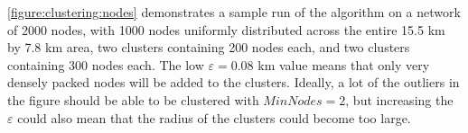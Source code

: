 
\autoref{figure:clustering:nodes} demonstrates a sample run of the algorithm on a network of 2000 nodes, with 1000 nodes uniformly distributed across the entire 15.5 km by 7.8 km area, two clusters containing 200 nodes each, and two clusters containing 300 nodes each. The low $\varepsilon = 0.08$ km value means that only very densely packed nodes will be added to the clusters. Ideally, a lot of the outliers in the figure should be able to be clustered with $MinNodes=2$, but increasing the $\varepsilon$ could also mean that the radius of the clusters could become too large.



